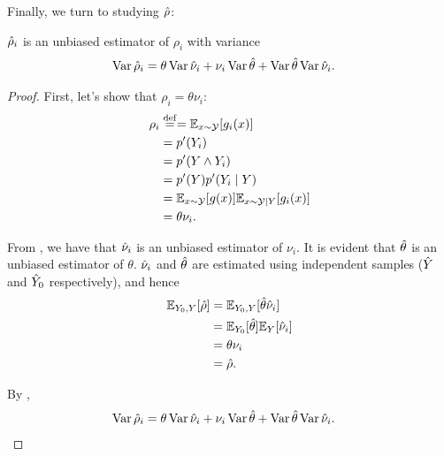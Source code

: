 Finally, we turn to studying ${\hat{\rho}}$:
\begin{theorem}
\label{thm:rhoh}
  ${\hat{\rho}}_i$ is an unbiased estimator of $\rho_i$ with variance
  \begin{align*}
    \operatorname{Var} {\hat{\rho}}_i &= \theta \operatorname{Var} {\hat{\nu}}_i + \nu_i \operatorname{Var}{\hat{\theta}} + \operatorname{Var}{\hat{\theta}} \operatorname{Var}{\hat{\nu}}_i.
  \end{align*}
\end{theorem}
\begin{proof}
  First, let's show that $\rho_i = \theta \nu_i$:
  \begin{align*}
    \rho_i 
    &\stackrel{\rm def}{=}= \mathbb{E}_{x \sim \mathcal{Y}}[g_i(x)] \\
      &= p'(Y_i) \\
      &= p'(Y \wedge Y_i) \\
      &= p'(Y) p'(Y_i \mid Y) \\
      &= \mathbb{E}_{x\sim \mathcal{Y}}[g(x)] \mathbb{E}_{x \sim \mathcal{Y}\mid Y}[g_i(x)] \\
      &= \theta \nu_i.
  \end{align*}


  From , we have that ${\hat{\nu}}_i$ is an unbiased estimator of $\nu_i$.
  It is evident that ${\hat{\theta}}$ is an unbiased estimator of $\theta$.
  ${\hat{\nu}}_i$ and ${\hat{\theta}}$ are estimated using independent samples (${\hat{Y}}$ and ${\hat{Y}}_0$ respectively), and hence
  \begin{align*}
    \mathbb{E}_{Y_0, Y}[{\hat{\rho}}] 
      &= \mathbb{E}_{Y_0, Y}[{\hat{\theta}} {\hat{\nu}}_i] \\
      &= \mathbb{E}_{Y_0}[{\hat{\theta}}] \mathbb{E}_Y[{\hat{\nu}}_i] \\
      &= \theta \nu_i \\
      &= {\hat{\rho}}.
  \end{align*}

  By ,
  \begin{align*}
    \operatorname{Var} {\hat{\rho}}_i &= \theta \operatorname{Var}{\hat{\nu}}_i + \nu_i \operatorname{Var}{\hat{\theta}} + \operatorname{Var}{\hat{\theta}} \operatorname{Var}{\hat{\nu}}_i.
  \end{align*}
\end{proof}
